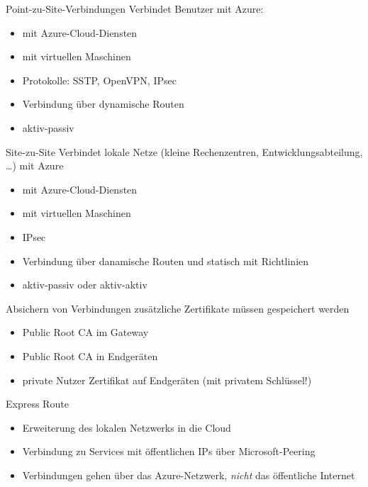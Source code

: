\begin{flashcard}[]{Point-zu-Site-Verbindungen}
  Verbindet Benutzer mit Azure:
  \begin{itemize}
    \item mit Azure-Cloud-Diensten
    \item mit virtuellen Maschinen
    \item Protokolle: SSTP, OpenVPN, IPsec
    \item Verbindung über dynamische Routen
    \item aktiv-passiv
  \end{itemize}
\end{flashcard}

\begin{flashcard}[]{Site-zu-Site}
  Verbindet lokale Netze (kleine Rechenzentren, Entwicklungsabteilung, \ldots) mit Azure
  \begin{itemize}
    \item mit Azure-Cloud-Diensten
    \item mit virtuellen Maschinen
    \item IPsec
    \item Verbindung über danamische Routen und statisch mit Richtlinien
    \item aktiv-passiv oder aktiv-aktiv
  \end{itemize}
\end{flashcard}

\begin{flashcard}[]{Absichern von Verbindungen}
  zusätzliche Zertifikate müssen gespeichert werden
  \begin{itemize}
    \item Public Root CA im Gateway
    \item Public Root CA in Endgeräten
    \item private Nutzer Zertifikat auf Endgeräten (mit privatem Schlüssel!)
  \end{itemize}
\end{flashcard}

\begin{flashcard}[]{Express Route}
  \begin{itemize}
    \item Erweiterung des lokalen Netzwerks in die Cloud
    \item Verbindung zu Services mit öffentlichen IPs über Microsoft-Peering
    \item Verbindungen gehen über das Azure-Netzwerk, \emph{nicht} das öffentliche Internet
  \end{itemize}
\end{flashcard}

